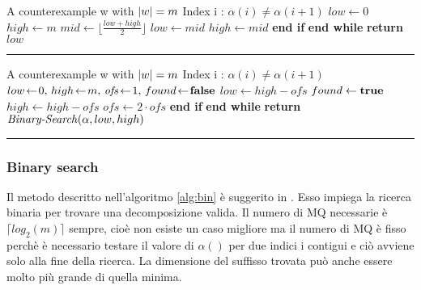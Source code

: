 \begin{minipage}{0.48\textwidth}
\captionsetup{format=ruled,labelfont=bf}
 \label{alg:bin}
   
    \begin{algorithmic}[0]
    \small
\Statex
\Input A counterexample w with $\lvert w\rvert=m$
\Output Index i : $\alpha(i) \neq \alpha(i+1)$
\State $low \gets 0$
\State $high \gets m$
\State $mid\gets \lfloor \frac {low+high}{2} \rfloor$
\State $low \gets mid$
\Else
\State $high \gets mid$
\EndIf
\EndWhile
\State \textbf{\quad\:\:end if}
\State \textbf{end while}
\State \textbf{return} $low$


\end{algorithmic}

  \kern2pt\hrule height.8pt\relax
\end{minipage}%
\hfill
\begin{minipage}{0.50\textwidth}
\captionsetup{format=ruled,labelfont=bf}
  \label{alg:exp}
  
    
    \begin{algorithmic}[0]
    \small
\Statex
\Input A counterexample w with $\lvert w\rvert=m$
\Output Index i : $\alpha(i) \neq \alpha(i+1)$
\State $low\! \gets \!0,\, high\! \gets \!m,\, \text{\textit{ofs}}\! \gets \!1,\, found\! \gets \!\text{\textbf{false}}$
\State $low \gets high - ofs$
\State $found \gets \text{\textbf{true}}$
\Else
\State $high \gets high-ofs$
\State $ofs \gets 2 \cdot ofs$
\EndIf
\EndWhile
\State \textbf{\quad\:\:end if}
\State \textbf{end while}
\State \textbf{return} $\text{\textit{Binary-Search}}(\alpha,low,high)$

\end{algorithmic}
  
  \kern2pt\hrule height.8pt\relax
\end{minipage}





   
\subsubsection{Binary search}
Il metodo descritto nell'algoritmo \ref{alg:bin} è suggerito in \cite{Schapire93}. Esso impiega la ricerca binaria per trovare una decomposizione valida. Il numero di \ac{MQ} necessarie è $\lceil log_{2}(m) \rceil$ sempre, cioè non esiste un caso migliore ma il numero di \ac{MQ} è fisso perchè è necessario testare il valore di $\alpha()$ per due indici i contigui e ciò avviene solo alla fine della ricerca. La dimensione del suffisso trovata può anche essere molto più grande di quella minima.
